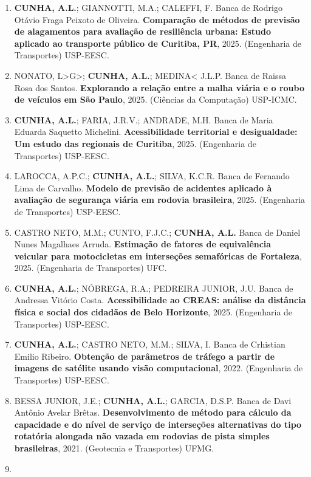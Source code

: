 \documentclass[
  brazilian,
  11pt,
  a4paper,
]{article}
\begin{document}
\begin{enumerate}
\def\labelenumi{\arabic{enumi}.}
\item
  \textbf{CUNHA, A.L.}; GIANNOTTI, M.A.; CALEFFI, F. Banca de Rodrigo
  Otávio Fraga Peixoto de Oliveira. \textbf{Comparação de métodos de
  previsão de alagamentos para avaliação de resiliência urbana: Estudo
  aplicado ao transporte público de Curitiba, PR}, 2025. (Engenharia de
  Transportes) USP-EESC.
\item
  NONATO, L\textgreater G\textgreater; \textbf{CUNHA, A.L.};
  MEDINA\textless{} J.L.P. Banca de Raissa Rosa dos Santos.
  \textbf{Explorando a relação entre a malha viária e o roubo de
  veículos em São Paulo}, 2025. (Ciências da Computação) USP-ICMC.
\item
  \textbf{CUNHA, A.L.}; FARIA, J.R.V.; ANDRADE, M.H. Banca de Maria
  Eduarda Saquetto Michelini. \textbf{Acessibilidade territorial e
  desigualdade: Um estudo das regionais de Curitiba}, 2025. (Engenharia
  de Transportes) USP-EESC.
\item
  LAROCCA, A.P.C.; \textbf{CUNHA, A.L.}; SILVA, K.C.R. Banca de Fernando
  Lima de Carvalho. \textbf{Modelo de previsão de acidentes aplicado à
  avaliação de segurança viária em rodovia brasileira}, 2025.
  (Engenharia de Transportes) USP-EESC.
\item
  CASTRO NETO, M.M.; CUNTO, F.J.C.; \textbf{CUNHA, A.L.} Banca de Daniel
  Nunes Magalhaes Arruda. \textbf{Estimação de fatores de equivalência
  veicular para motocicletas em interseções semafóricas de Fortaleza},
  2025. (Engenharia de Transportes) UFC.
\item
  \textbf{CUNHA, A.L.}; NÓBREGA, R.A.; PEDREIRA JUNIOR, J.U. Banca de
  Andressa Vitório Costa. \textbf{Acessibilidade ao CREAS: análise da
  distância física e social dos cidadãos de Belo Horizonte}, 2025.
  (Engenharia de Transportes) USP-EESC.
\item
  \textbf{CUNHA, A.L.}; CASTRO NETO, M.M.; SILVA, I. Banca de Crhistian
  Emilio Ribeiro. \textbf{Obtenção de parâmetros de tráfego a partir de
  imagens de satélite usando visão computacional}, 2022. (Engenharia de
  Transportes) USP-EESC.
\item
  BESSA JUNIOR, J.E.; \textbf{CUNHA, A.L.}; GARCIA, D.S.P. Banca de Davi
  Antônio Avelar Brêtas. \textbf{Desenvolvimento de método para cálculo
  da capacidade e do nível de serviço de interseções alternativas do
  tipo rotatória alongada não vazada em rodovias de pista simples
  brasileiras}, 2021. (Geotecnia e Transportes) UFMG.
\item

\end{enumerate}
\end{document}
